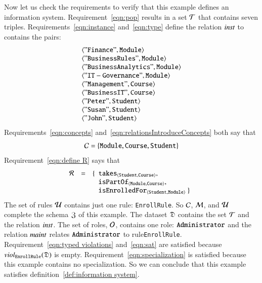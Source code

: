 \documentclass{elsarticle}
\begin{document}
   Now let us check the requirements to verify that this example defines an information system.
   Requirement~\ref{eqn:pop} results in a set $\mathcal{T}$ that contains seven triples.
   Requirements~\ref{eqn:instance} and~\ref{eqn:type} define the relation $\text{\it inst\/}$ to contains the pairs:
   \[\begin{array}{l}
      \langle{\tt "Finance"},{\tt Module}\rangle\\
      \langle{\tt "Business Rules"},{\tt Module}\rangle\\
      \langle{\tt "Business Analytics"},{\tt Module}\rangle\\
      \langle{\tt "IT-Governance"},{\tt Module}\rangle\\
      \langle{\tt "Management"},{\tt Course}\rangle\\
      \langle{\tt "Business IT"},{\tt Course}\rangle\\
      \langle{\tt "Peter"},{\tt Student}\rangle\\
      \langle{\tt "Susan"},{\tt Student}\rangle\\
      \langle{\tt "John"},{\tt Student}\rangle
   \end{array}\]
   Requirements~\ref{eqn:concepts} and~\ref{eqn:relationsIntroduceConcepts} both say that 
   \[\mathcal{C}=\{ {\tt Module}, {\tt Course}, {\tt Student}\}\]
   Requirement~\ref{eqn:define R} says that 
   \[\begin{array}{rcl}
      \rels&=&\{\begin{array}[t]{l}
                  \declare{\tt takes}{\tt Student}{\tt Course},\\
                  \declare{\tt isPartOf}{\tt Module}{\tt Course},\\
                  \declare{\tt isEnrolledFor}{\tt Student}{\tt Module}\ \}
                \end{array}
     \end{array}
   \]
   The set of rules $\mathcal{U}$ contains just one rule: \verb-EnrollRule-.
   So $\mathcal{C}$, $\mathcal{M}$, and $\mathcal{U}$ complete the schema $\mathfrak{Z}$ of this example.
   The dataset $\mathfrak{D}$ contains the set $\mathcal{T}$ and the relation $\text{\it inst\/}$.
   The set of roles, $\mathcal{O}$, contains one role: ${\tt Administrator}$
   and the relation $\text{\it maint\/}$ relates ${\tt Administrator}$ to rule\verb-EnrollRule-.
   Requirement~\ref{eqn:typed violations} and~\ref{eqn:sat} are satisfied because $\text{\it viol\/}_{\tt EnrollRule}(\mathfrak{D})$ is empty.
   Requirement~\ref{eqn:specialization} is satisfied because this example contains no specialization.
   So we can conclude that this example satisfies definition~\ref{def:information system}.
\end{document}
